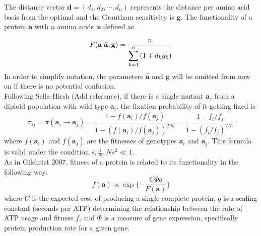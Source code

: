 \documentclass[13pt]{article}
\begin{document}
The distance vector $\mathbf{d} = (d_1, d_2, \cdots, d_n)$ represents the distance per amino acid basis from the optimal and the Grantham sensitivity is $\mathbf{g}$. The functionality of a protein $\mathbf{a}$ with $n$ amino acids is defined as

\begin{equation}
F(\mathbf{a}| \hat{\mathbf{a}},\mathbf{g})  =  \frac{n}{\displaystyle  \sum_{k=1}^n{(1+d_kg_k)}} \label{eq:harmonic}\\
\end{equation}
In order to simplify notation, the parameters $\hat{\mathbf{a}}$ and $\mathbf{g}$ will be omitted from now on if there is no potential confusion.\\

Following Sella-Hirsh (Add reference), if there is a single mutant $\mathbf{a}_j$ from a diploid population with wild type $\mathbf{a}_i$, the fixation probability of it getting fixed is 
\begin{equation}
\pi_{ij} = \pi(\mathbf{a}_i \rightarrow \mathbf{a}_j ) = \frac{1-f(\mathbf{a}_i)/f(\mathbf{a}_j)}{1-(f(\mathbf{a}_i)/f(\mathbf{a}_j))^{2N_e}} = \frac{1-f_i/f_j}{1-(f_i/f_j)^{2N_e}}
\label{eq:fixation}
\end{equation}
where $f(\mathbf{a}_i)$ and $f(\mathbf{a}_j)$ are the fitnesses of genotypes $\mathbf{a}_i$ and $\mathbf{a}_j$. This formula is valid under the condition $s, \frac{1}{N}, Ns^2 \ll 1$.\\

%
%


As in Gilchrist 2007, fitness of a protein is related to its functionality in the following way:
\[f(\mathbf{a}) \propto \exp\{-\frac{C\Phi q}{F(\mathbf{a})}\}\]
where $C$ is the expected cost of producing a single complete protein, $q$ is a scaling constant (seconds per ATP) determining the relationship between the rate of ATP usage and fitness $f$, and $\Phi$ is a measure of gene expression, specifically protein production rate for a given gene. \\
\end{document}
